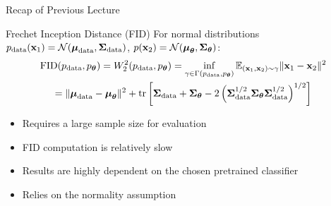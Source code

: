 \documentclass{beamer}
\begin{document}
\begin{frame}
\titlepage
\end{frame}
\begin{frame}{Recap of Previous Lecture}
	\vspace{-0.3cm}
	\begin{block}{Frechet Inception Distance (FID)}
		For normal distributions $p_{\text{data}}(\mathbf{x}_1) = \mathcal{N}(\boldsymbol{\mu}_{\text{data}}, \boldsymbol{\Sigma}_{\text{data}})$, $p(\mathbf{x}_2) = \mathcal{N}(\boldsymbol{\mu}_{\boldsymbol{\theta}}, \boldsymbol{\Sigma}_{\boldsymbol{\theta}})$:
		\vspace{-0.3cm}
		\begin{multline*}
			\mathrm{FID} (p_{\text{data}}, p_{\boldsymbol{\theta}}) =  W_2^2(p_{\text{data}}, p_{\boldsymbol{\theta}}) = \inf_{\gamma \in \Gamma(p_{\text{data}}, p_{\boldsymbol{\theta}})} \mathbb{E}_{(\mathbf{x}_1, \mathbf{x}_2) \sim \gamma} \| \mathbf{x}_1 - \mathbf{x}_2 \|^2 \\
			= \| \boldsymbol{\mu}_{\text{data}} - \boldsymbol{\mu}_{\boldsymbol{\theta}}\|^2 + \text{tr} \left[ \boldsymbol{\Sigma}_{\text{data}} + \boldsymbol{\Sigma}_{\boldsymbol{\theta}} - 2 \left(\boldsymbol{\Sigma}_{\text{data}}^{1/2} \boldsymbol{\Sigma}_{\boldsymbol{\theta}} \boldsymbol{\Sigma}_{\text{data}}^{1/2} \right)^{1/2} \right]
		\end{multline*}
		\vspace{-0.4cm}
	\end{block}
	\begin{itemize}
		\item Requires a large sample size for evaluation
		\item FID computation is relatively slow
		\item Results are highly dependent on the chosen pretrained classifier
		\item Relies on the normality assumption
	\end{itemize}
\end{frame}
\end{document}

